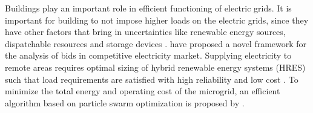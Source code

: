 
Buildings play an important role in efficient functioning of electric grids. 
It is important for building to not impose higher loads on the electric grids, since they have other factors that bring in uncertainties like renewable energy sources, dispatchable resources and storage devices \citep{tf_pricing}.  
\cite{cmot_bid} have proposed a novel framework for the analysis of bids in competitive electricity market. 
Supplying electricity to remote areas requires optimal sizing of hybrid renewable energy systems (HRES) such that load requirements are satisfied with high reliability and low cost \citep{tf_renewable}. 
To minimize the total energy and operating cost of the microgrid, an efficient algorithm based on particle swarm optimization is proposed by \cite{tf_swarm}.  


